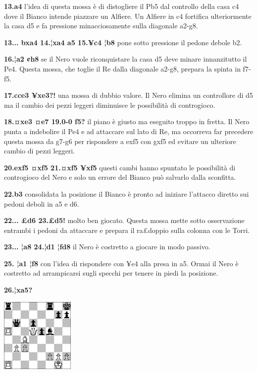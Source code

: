 \documentclass[
]{article}
\begin{document}
\textbf{13.a4} l'idea di questa mossa è di distogliere il Pb5 dal
controllo della casa c4 dove il Bianco intende piazzare un Alfiere. Un
Alfiere in c4 fortifica ulteriormente la casa d5 e fa pressione
minacciosamente sulla diagonale a2-g8.

\textbf{13... bxa4 14.¦xa4 a5 15.¥c4 ¦b8} pone sotto pressione il pedone
debole b2.

\textbf{16.¦a2 ¢h8} se il Nero vuole riconquistare la casa d5 deve
minare innanzitutto il Pe4. Questa mossa, che toglie il Re dalla
diagonale a2-g8, prepara la spinta in f7-f5.

\textbf{17.cce3 ¥xe3?!} una mossa di dubbio valore. Il Nero elimina un
controllore di d5 ma il cambio dei pezzi leggeri diminuisce le
possibilità di controgioco.

\textbf{18.¤xe3 ¤e7 19.0-0 f5?} il piano è giusto ma eseguito troppo in
fretta. Il Nero punta a indebolire il Pe4 e ad attaccare sul lato di Re,
ma occorreva far precedere questa mossa da g7-g6 per rispondere a exf5
con gxf5 ed evitare un ulteriore cambio di pezzi leggeri.

\textbf{20.exf5 ¤xf5 21.¤xf5 ¥xf5} questi cambi hanno spuntato le
possibilità di controgioco del Nero e solo un errore del Bianco può
salvarlo dalla sconfitta.

\textbf{22.b3} consolidata la posizione il Bianco è pronto ad iniziare
l'attacco diretto sui pedoni deboli in a5 e d6.

\textbf{22... £d6 23.£d5!} molto ben giocato. Questa mossa mette sotto
osservazione entrambi i pedoni da attaccare e prepara il ra£doppio sulla
colonna con le Torri.

\textbf{23... ¦a8 24.¦d1 ¦fd8} il Nero è costretto a giocare in modo
passivo.

\textbf{25. ¦a1 ¦f8} con l'idea di rispondere con ¥e4 alla presa in a5.
Ormai il Nero è costretto ad arrampicarsi sugli specchi per tenere in
piedi la posizione.

\textbf{26.¦xa5?}

\includegraphics[width=1.40972in,height=1.40972in]{vertopal_109f12be458a423d8f3cc838880eaea2/media/image30.png}
\end{document}
